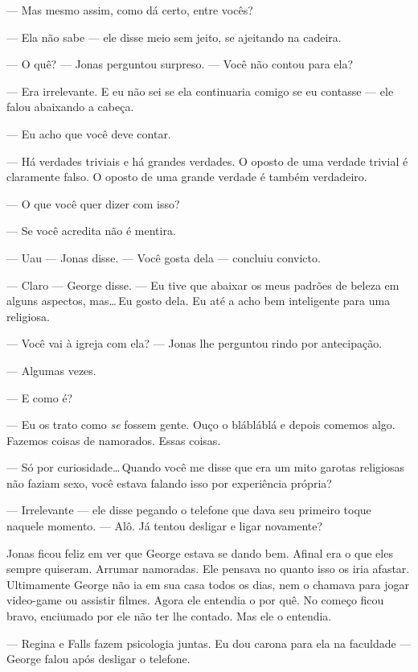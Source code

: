 --- Mas mesmo assim, como dá certo, entre vocês?

--- Ela não sabe --- ele disse meio sem jeito, se ajeitando na cadeira.

--- O quê? --- Jonas perguntou surpreso. --- Você não contou para ela?

--- Era irrelevante. E eu não sei se ela continuaria comigo se eu contasse --- ele falou\mudanca{,} abaixando a cabeça.

--- Eu acho que você deve contar.

--- Há verdades triviais e há grandes verdades. O oposto de uma verdade trivial é claramente falso. O oposto de uma grande verdade é também verdadeiro.

--- O que você quer dizer com isso?

--- Se você acredita não é mentira.

--- Uau --- Jonas disse. --- Você gosta dela --- concluiu\mudanca{,} convicto.

--- Claro --- George disse. --- Eu tive que abaixar os meus padrões de beleza em alguns aspectos, mas\ldots\,Eu gosto dela. Eu até a acho bem inteligente para uma religiosa.

--- Você vai à igreja com ela? --- Jonas lhe perguntou rindo por antecipação.

--- Algumas vezes.

--- E como é?

--- Eu os trato como \emph{se} fossem gente. Ouço o blábláblá e depois comemos algo. Fazemos coisas de namorados. Essas coisas.

--- Só por curiosidade\ldots\,Quando você me disse que era um mito garotas religiosas não faziam sexo, você estava falando isso por experiência própria?

--- Irrelevante --- ele disse\mudanca{,} pegando o telefone que dava seu primeiro toque naquele momento. --- Alô. Já tentou desligar e ligar novamente?

Jonas ficou feliz em ver que George estava se dando bem. Afinal\mudanca{,} era o que eles sempre quiseram. Arrumar namoradas. Ele pensava no quanto isso os iria afastar. Ultimamente George não ia em sua casa todos os dias, nem o chamava para jogar video-game ou assistir filmes. Agora ele entendia o por quê. No começo ficou bravo, enciumado por ele não ter lhe contado. Mas ele o entendia.

 --- Regina e Falls fazem psicologia juntas. Eu dou carona para ela na faculdade --- George falou após desligar o telefone.

